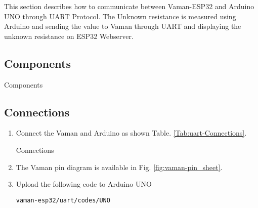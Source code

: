 This section describes how to communicate between Vaman-ESP32 and Arduino UNO 
through UART Protocol. The Unknown resistance is measured using Arduino and 
sending the value to Vaman through UART and displaying the unknown resistance on
ESP32 Webserver.
\subsection{Components}

\begin{table}[!ht]
\centering

\caption{Components}
\label{table:uart-components}
\end{table}

\subsection{Connections}
\begin{enumerate}[label=\thesection.\arabic*.,ref=\thesection.\theenumi]

\item
Connect the Vaman and Arduino as shown Table. \ref{Tab:uart-Connections}.

\begin{table}[!ht]
\centering

\caption{Connections}
\label{Tab:uart-Connections}
\end{table}
\item
The Vaman pin diagram is available in Fig. \ref{fig:vaman-pin_sheet}.

\item Upload the following code to Arduino UNO

\begin{lstlisting}
vaman-esp32/uart/codes/UNO
\end{lstlisting}
\end{enumerate}
